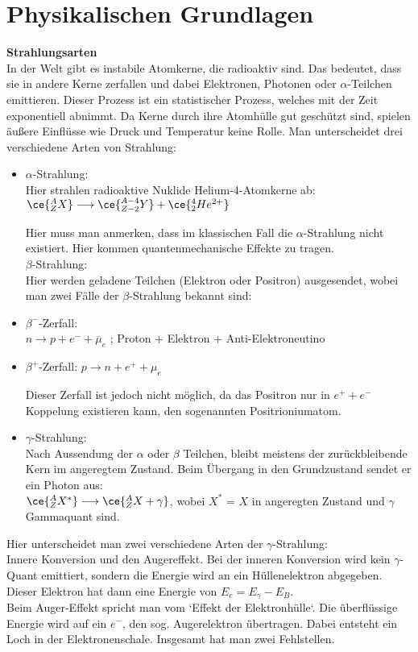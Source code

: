 \documentclass[11pt,a4paper]{article}
\begin{document}
\section{Physikalischen Grundlagen}
\textbf{Strahlungsarten}\\
In der Welt gibt es instabile Atomkerne, die radioaktiv sind. Das bedeutet, dass sie in andere Kerne zerfallen und dabei Elektronen, Photonen oder $\alpha$-Teilchen emittieren. Dieser Prozess ist ein statistischer Prozess, welches mit der Zeit exponentiell abnimmt. Da Kerne durch ihre Atomhülle gut geschützt sind, spielen äußere Einflüsse wie Druck und Temperatur keine Rolle. 
Man unterscheidet drei verschiedene Arten von Strahlung:
\begin{itemize}
\item{$\alpha$-Strahlung:}\\
Hier strahlen radioaktive Nuklide Helium-4-Atomkerne ab:\\
$\ce{^{A}_{Z}X} \longrightarrow \ce{^{A-4}_{Z-2}Y} + \ce{^{4}_{2}He^{2+}}$

Hier muss man anmerken, dass im klassischen Fall die $\alpha$-Strahlung nicht existiert. Hier kommen quantenmechanische Effekte zu tragen.\\

$\beta$-Strahlung:\\
Hier werden geladene Teilchen (Elektron oder Positron) ausgesendet, wobei man zwei Fälle der $\beta$-Strahlung bekannt sind:
\item{$\beta^{-}$-Zerfall:}\\
$n \longrightarrow p + e^{-} + \overline{\mu}_{e}$ ; Proton + Elektron + Anti-Elektroneutino

\item{$\beta^{+}$-Zerfall:}
$p \longrightarrow n + e^{+} + \mu_{e}$

Dieser Zerfall ist jedoch nicht möglich, da das Positron nur in $e^+ + e^-$ Koppelung existieren kann, den sogenannten Positrioniumatom.
\item{$\gamma$-Strahlung:}\\
Nach Aussendung der $\alpha$ oder $\beta$ Teilchen, bleibt meistens der zurückbleibende Kern im angeregtem Zustand. Beim Übergang in den Grundzustand sendet er ein Photon aus:\\ 
$\ce{^{A}_{Z}X^{*}}\longrightarrow \ce{^{A}_{Z}X + \gamma}$, wobei $X^{*}$ = $X$ in angeregten Zustand und $\gamma$ Gammaquant sind.\\
\end{itemize}
Hier unterscheidet man zwei verschiedene Arten der $\gamma$-Strahlung:\\
Innere Konversion und den Augereffekt.
Bei der inneren Konversion wird kein $\gamma$-Quant emittiert, sondern die Energie wird an ein Hüllenelektron abgegeben. Dieser Elektron hat dann eine Energie von $E_e = E_{\gamma} - E_B$.\\
Beim Auger-Effekt spricht man vom `Effekt der Elektronhülle`. Die überflüssige Energie wird auf ein $e^-$, den sog. Augerelektron übertragen. Dabei entsteht ein Loch in der Elektronenschale. Insgesamt hat man zwei Fehlstellen.\\
\end{document}
